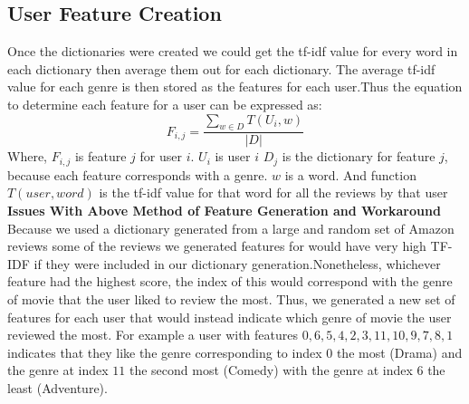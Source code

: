 \documentclass{article}
\begin{document}
\subsection{User Feature Creation}
Once the dictionaries were created we could get the tf-idf value for every word in each dictionary then average them out for each dictionary. The average tf-idf value for each genre is then stored as the features for each user.Thus the equation to determine each feature for a user can be expressed as:
$$F_{i,j} = \frac{\sum\limits_{w \in D} T(U_i, w)}{|D|}$$
Where, $F_{i,j}$ is feature $j$ for user $i$.\newline
$U_i$ is user $i$\newline
$D_j$ is the dictionary for feature $j$, because each feature corresponds with a genre. \newline
$w$ is a word. \newline
And function $T(user, word)$ is the tf-idf value for that word for all the reviews by that user\newline\newline
\textbf{Issues With Above Method of Feature Generation and Workaround}\newline
Because we used a dictionary generated from a large and random set of Amazon reviews some of the reviews we generated features for would have very high TF-IDF if they were included in our dictionary generation.Nonetheless, whichever feature had the highest score, the index of this would correspond with the genre of movie that the user liked to review the most. Thus, we generated a new set of features for each user that would instead indicate which genre of movie the user reviewed the most. For example a user with features $0,6,5,4,2,3,11,10,9,7,8,1$ indicates that they like the genre corresponding to index $0$ the most (Drama) and the genre at index $11$ the second most (Comedy) with the genre at index $6$ the least (Adventure).  
\end{document}
